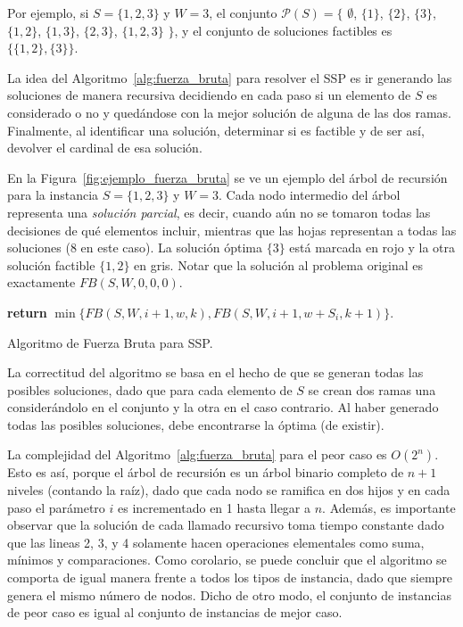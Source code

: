 \documentclass[10pt,a4paper]{article}
\begin{document}
Por ejemplo, si $S = \{1, 2, 3 \}$ y $W = 3$, el conjunto $\mathcal{P}(S) = \{ $ $\emptyset$, $\{1\}$, $\{2\}$, $\{3\}$,  $\{1, 2\}$, $\{1, 3\}$, $\{2, 3\}$, $\{1, 2, 3\}$ $\}$, y el conjunto de soluciones factibles es $\{ \{1, 2\}, \{3\} \}$.

La idea del Algoritmo~\ref{alg:fuerza_bruta} para resolver el SSP es ir generando las soluciones de manera recursiva decidiendo en cada paso si un elemento de $S$ es considerado o no y quedándose con la mejor solución de alguna de las dos ramas. Finalmente, al identificar una solución, determinar si es factible y de ser así, devolver el cardinal de esa solución.

En la Figura~\ref{fig:ejemplo_fuerza_bruta} se ve un ejemplo del árbol de recursión para la instancia $S =\{1, 2, 3\}$ y $W=3$. Cada nodo intermedio del árbol representa una \emph{solución parcial}, es decir, cuando aún no se tomaron todas las decisiones de qué elementos incluir, mientras que las hojas representan a todas las soluciones (8 en este caso). La solución óptima $\{3\}$ está marcada en rojo y la otra solución factible $\{1, 2\}$ en gris. Notar que la solución al problema original es exactamente $FB(S, W, 0, 0, 0)$.

\begin{algorithm}
\begin{algorithmic}[1]
    \EndIf
    \State \textbf{return} $\min \{ FB(S, W, i+1, w, k), FB(S, W, i+1, w+S_i, k+1) \}$.
\EndFunction
\end{algorithmic}
\caption{Algoritmo de Fuerza Bruta para SSP.}
\label{alg:fuerza_bruta}
\end{algorithm}

La correctitud del algoritmo se basa en el hecho de que se generan todas las posibles soluciones, dado que para cada elemento de $S$ se crean dos ramas una considerándolo en el conjunto y la otra en el caso contrario. Al haber generado todas las posibles soluciones, debe encontrarse la óptima (de existir).

La complejidad del Algoritmo~\ref{alg:fuerza_bruta} para el peor caso es $O(2^n)$. Esto es así, porque el árbol de recursión es un árbol binario completo de $n+1$ niveles (contando la raíz), dado que cada nodo se ramifica en dos hijos y en cada paso el parámetro $i$ es incrementado en 1 hasta llegar a $n$. Además, es importante observar que la solución de cada llamado recursivo toma tiempo constante dado que las lineas 2, 3, y 4 solamente hacen operaciones elementales como suma, mínimos y comparaciones. Como corolario, se puede concluir que el algoritmo se comporta de igual manera frente a todos los tipos de instancia, dado que siempre genera el mismo número de nodos. Dicho de otro modo, el conjunto de instancias de peor caso es igual al conjunto de instancias de mejor caso. 
\end{document}
